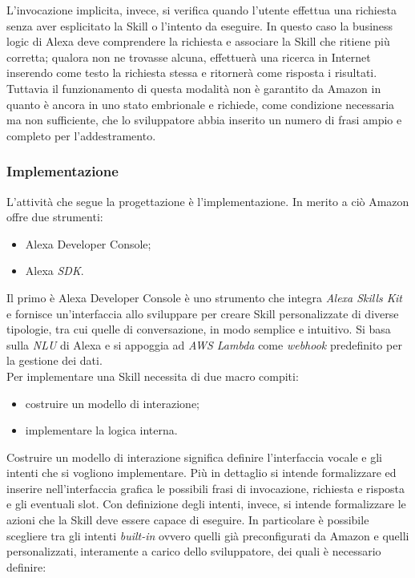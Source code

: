 		L'invocazione implicita, invece, si verifica quando l'utente effettua una richiesta senza aver esplicitato la Skill o l'intento da eseguire. In questo caso la business logic di Alexa deve comprendere la richiesta e associare la Skill che ritiene più corretta; qualora non ne trovasse alcuna, effettuerà una ricerca in Internet inserendo come testo la richiesta stessa e ritornerà come risposta i risultati. Tuttavia il funzionamento di questa modalità non è garantito da Amazon in quanto è ancora in uno stato embrionale e richiede, come condizione necessaria ma non sufficiente, che lo sviluppatore abbia inserito un numero di frasi ampio e completo per l'addestramento.
		\subsubsection{Implementazione}
		L'attività che segue la progettazione è l'implementazione. In merito a ciò Amazon offre due strumenti:
		\begin{itemize}
			\item Alexa Developer Console;
			\item Alexa \textit{SDK}.
		\end{itemize}
		Il primo è Alexa Developer Console è uno strumento che integra \textit{Alexa Skills Kit} e fornisce un'interfaccia allo sviluppare per creare Skill personalizzate di diverse tipologie, tra cui quelle di conversazione, in modo semplice e intuitivo. Si basa sulla \textit{NLU} di Alexa e si appoggia ad \textit{AWS Lambda} come \textit{webhook} predefinito per la gestione dei dati. \\
		Per implementare una Skill necessita di due macro compiti:
		\begin{itemize}
			\item costruire un modello di interazione;
			\item implementare la logica interna.
		\end{itemize}
		Costruire un modello di interazione significa definire l'interfaccia vocale e gli intenti che si vogliono implementare. Più in dettaglio si intende formalizzare ed inserire nell'interfaccia grafica le possibili frasi di invocazione, richiesta e risposta e gli eventuali slot. Con definizione degli intenti, invece, si intende formalizzare le azioni che la Skill deve essere capace di eseguire. In particolare è possibile scegliere tra gli intenti \textit{built-in} ovvero quelli già preconfigurati da Amazon e quelli personalizzati, interamente a carico dello sviluppatore, dei quali è necessario definire:
